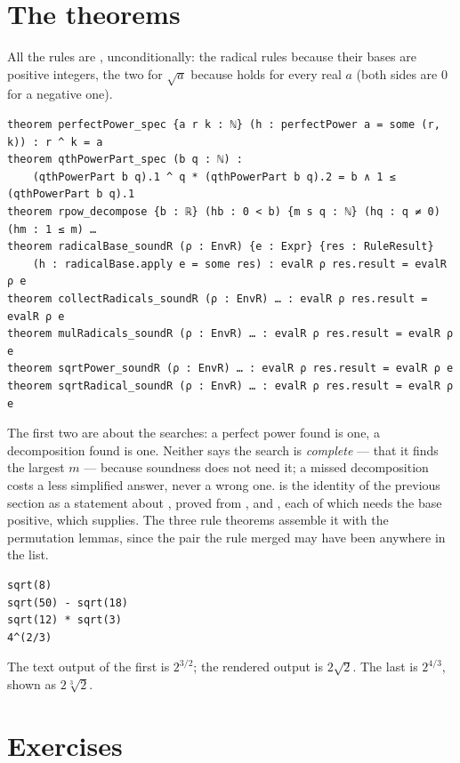 \section{The theorems}

All the rules are , unconditionally: the radical rules because their bases are
positive integers, the two for $\sqrt a$ because  holds for every real $a$
(both sides are $0$ for a negative one).

\begin{verbatim}
theorem perfectPower_spec {a r k : ℕ} (h : perfectPower a = some (r, k)) : r ^ k = a
theorem qthPowerPart_spec (b q : ℕ) :
    (qthPowerPart b q).1 ^ q * (qthPowerPart b q).2 = b ∧ 1 ≤ (qthPowerPart b q).1
theorem rpow_decompose {b : ℝ} (hb : 0 < b) {m s q : ℕ} (hq : q ≠ 0) (hm : 1 ≤ m) …
theorem radicalBase_soundR (ρ : EnvR) {e : Expr} {res : RuleResult}
    (h : radicalBase.apply e = some res) : evalR ρ res.result = evalR ρ e
theorem collectRadicals_soundR (ρ : EnvR) … : evalR ρ res.result = evalR ρ e
theorem mulRadicals_soundR (ρ : EnvR) … : evalR ρ res.result = evalR ρ e
theorem sqrtPower_soundR (ρ : EnvR) … : evalR ρ res.result = evalR ρ e
theorem sqrtRadical_soundR (ρ : EnvR) … : evalR ρ res.result = evalR ρ e
\end{verbatim}

The first two are about the searches: a perfect power found is one, a decomposition found is one.
Neither says the search is \emph{complete} --- that it finds the largest $m$ --- because
soundness does not need it; a missed decomposition costs a less simplified answer, never a wrong
one.  is the identity of the previous section as a statement about
, proved from ,  and ,
each of which needs the base positive, which  supplies. The three rule
theorems assemble it with the permutation lemmas, since the pair the rule merged may have been
anywhere in the list.

\begin{trybox}
\begin{verbatim}
sqrt(8)
sqrt(50) - sqrt(18)
sqrt(12) * sqrt(3)
4^(2/3)
\end{verbatim}
  The text output of the first is $2^{3/2}$; the rendered output is $2\sqrt 2$. The last is
  $2^{4/3}$, shown as $2\sqrt[3]{2}$.
\end{trybox}

\section{Exercises}

